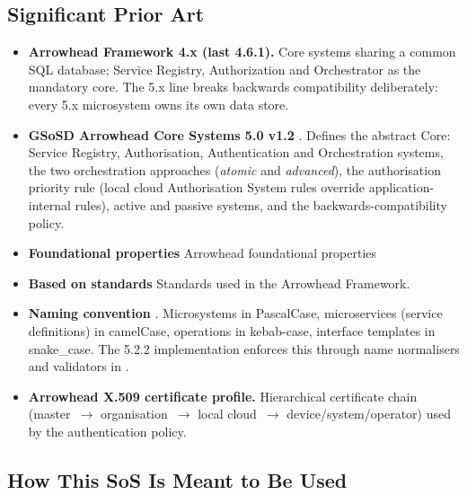 \documentclass[a4paper]{arrowhead}
\begin{document}

\subsection{Significant Prior Art}
\label{sec:prior_art}

\begin{itemize}
  \item \textbf{Arrowhead Framework 4.x (last 4.6.1).} Core systems sharing a common SQL
        database; Service Registry, Authorization and Orchestrator as the mandatory core. The 5.x
        line breaks backwards compatibility deliberately: every 5.x microsystem owns its own data
        store.
  \item \textbf{GSoSD Arrowhead Core Systems 5.0 v1.2} \cite{gsosd50}. Defines the abstract
        Core: Service Registry, Authorisation, Authentication and Orchestration systems, the two
        orchestration approaches (\emph{atomic} and \emph{advanced}), the authorisation priority
        rule (local cloud Authorisation System rules override application-internal rules), active
        and passive systems, and the backwards-compatibility policy.
   \item \textbf{Foundational properties} \cite{FoundationaProperties}
     Arrowhead foundational properties
   \item \textbf{Based on standards} \cite{BasedOnStandards}
     Standards used in the Arrowhead Framework. 
   \item \textbf{Naming convention} \cite{naming2}. Microsystems in PascalCase, microservices
        (service definitions) in camelCase, operations in kebab-case, interface templates in
        snake\_case. The 5.2.2 implementation enforces this through name normalisers and
        validators in .
  \item \textbf{Arrowhead X.509 certificate profile.} Hierarchical certificate chain
        (master~$\rightarrow$ organisation~$\rightarrow$ local cloud~$\rightarrow$
        device/system/operator) used by the  authentication policy.
\end{itemize}

\subsection{How This SoS Is Meant to Be Used}
\label{sec:use}
\end{document}
